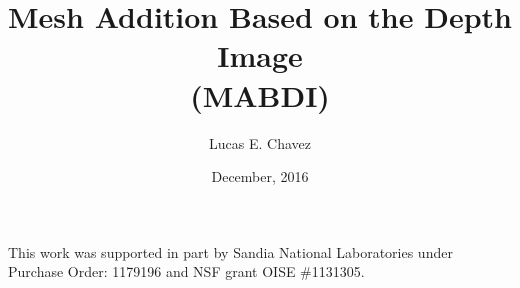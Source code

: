 \documentclass[botnum, nobox]{unmeethesis}
\begin{document}

\frontmatter

\setlength{\parskip}{0.30cm}

\title{Mesh Addition Based on the Depth Image\\(MABDI)}

\author{Lucas E. Chavez}





\date{December, 2016}

\maketitle

\setcounter{page}{3} %


\begin{acknowledgments}
   \vspace{1.1in}
   This work was supported in part by Sandia National Laboratories under
   Purchase Order: 1179196 and  NSF grant OISE \#1131305.
\end{acknowledgments}

\maketitleabstract %
\end{document}
